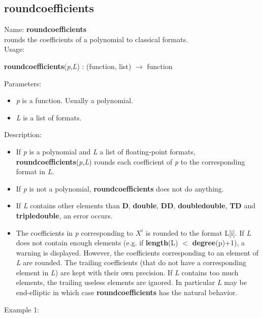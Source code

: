 \subsection{roundcoefficients}
\label{labroundcoefficients}
\noindent Name: \textbf{roundcoefficients}\\
rounds the coefficients of a polynomial to classical formats.\\
\noindent Usage: 
\begin{center}
\textbf{roundcoefficients}(\emph{p},\emph{L}) : (\textsf{function}, \textsf{list}) $\rightarrow$ \textsf{function}\\
\end{center}
Parameters: 
\begin{itemize}
\item \emph{p} is a function. Usually a polynomial.
\item \emph{L} is a list of formats.
\end{itemize}
\noindent Description: \begin{itemize}

\item If \emph{p} is a polynomial and \emph{L} a list of floating-point formats, 
   \textbf{roundcoefficients}(\emph{p},\emph{L}) rounds each coefficient of \emph{p} to the corresponding format
   in \emph{L}.

\item If \emph{p} is not a polynomial, \textbf{roundcoefficients} does not do anything.

\item If \emph{L} contains other elements than \textbf{D}, \textbf{double}, \textbf{DD}, \textbf{doubledouble}, \textbf{TD} and
   \textbf{tripledouble}, an error occurs.

\item The coefficients in \emph{p} corresponding to $X^i$ is rounded to the 
   format L[i]. If \emph{L} does not contain enough elements
   (e.g. if \textbf{length}(L) $<$ \textbf{degree}(p)+1), a warning is displayed. However, the
   coefficients corresponding to an element of \emph{L} are rounded. The trailing 
   coefficients (that do not have a corresponding element in \emph{L}) are kept with
   their own precision.
   If \emph{L} contains too much elements, the trailing useless elements are ignored.
   In particular \emph{L} may be end-elliptic in which case \textbf{roundcoefficients} has the 
   natural behavior.
\end{itemize}
\noindent Example 1: 

